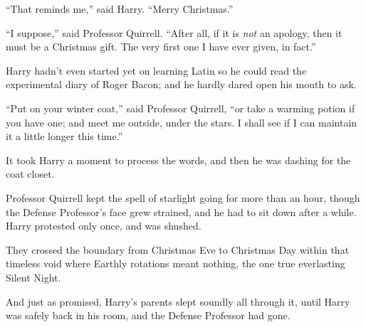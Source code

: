 ``That reminds me,'' said Harry. ``Merry Christmas.''

``I suppose,'' said Professor Quirrell. ``After all, if it is \emph{not} an apology, then it must be a Christmas gift. The very first one I have ever given, in fact.''

Harry hadn't even started yet on learning Latin so he could read the experimental diary of Roger Bacon; and he hardly dared open his mouth to ask.

``Put on your winter coat,'' said Professor Quirrell, ``or take a warming potion if you have one; and meet me outside, under the stars. I shall see if I can maintain it a little longer this time.''

It took Harry a moment to process the words, and then he was dashing for the coat closet.

Professor Quirrell kept the spell of starlight going for more than an hour, though the Defense Professor's face grew strained, and he had to sit down after a while. Harry protested only once, and was shushed.

They crossed the boundary from Christmas Eve to Christmas Day within that timeless void where Earthly rotations meant nothing, the one true everlasting Silent Night.

And just as promised, Harry's parents slept soundly all through it, until Harry was safely back in his room, and the Defense Professor had gone.

